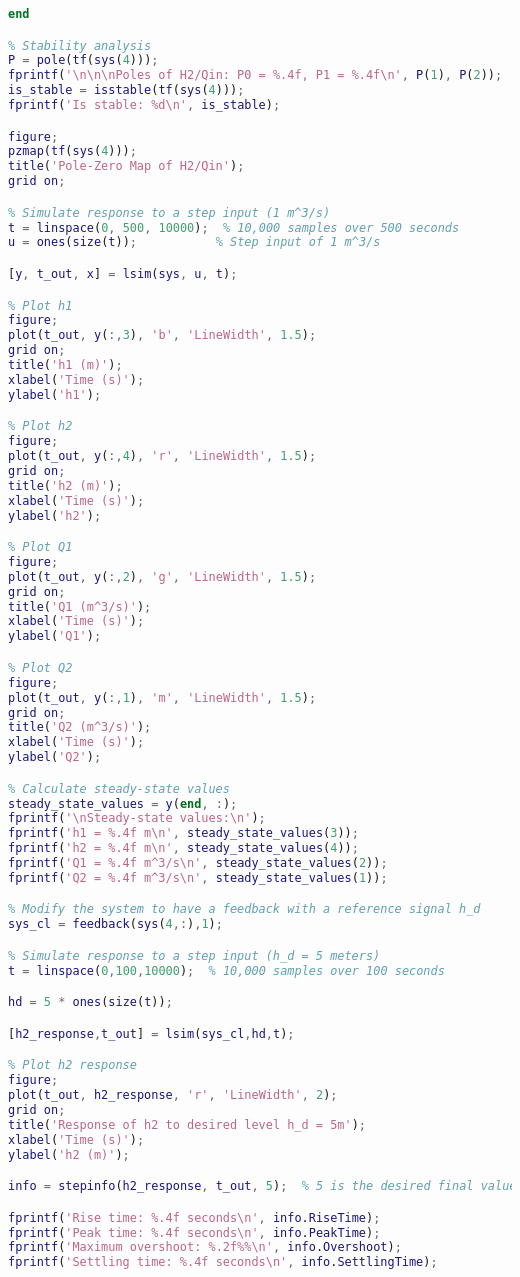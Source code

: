 \documentclass{report}
\begin{document}
\begin{flushleft}
\begin{lstlisting}[language=Matlab, caption=project code,label=lst:code]
end

% Stability analysis
P = pole(tf(sys(4)));
fprintf('\n\n\nPoles of H2/Qin: P0 = %.4f, P1 = %.4f\n', P(1), P(2));
is_stable = isstable(tf(sys(4)));
fprintf('Is stable: %d\n', is_stable);

figure;
pzmap(tf(sys(4)));
title('Pole-Zero Map of H2/Qin');
grid on;

% Simulate response to a step input (1 m^3/s)
t = linspace(0, 500, 10000);  % 10,000 samples over 500 seconds
u = ones(size(t));           % Step input of 1 m^3/s

[y, t_out, x] = lsim(sys, u, t);

% Plot h1
figure;
plot(t_out, y(:,3), 'b', 'LineWidth', 1.5);
grid on;
title('h1 (m)');
xlabel('Time (s)');
ylabel('h1');

% Plot h2
figure;
plot(t_out, y(:,4), 'r', 'LineWidth', 1.5);
grid on;
title('h2 (m)');
xlabel('Time (s)');
ylabel('h2');

% Plot Q1
figure;
plot(t_out, y(:,2), 'g', 'LineWidth', 1.5);
grid on;
title('Q1 (m^3/s)');
xlabel('Time (s)');
ylabel('Q1');

% Plot Q2
figure;
plot(t_out, y(:,1), 'm', 'LineWidth', 1.5);
grid on;
title('Q2 (m^3/s)');
xlabel('Time (s)');
ylabel('Q2');

% Calculate steady-state values
steady_state_values = y(end, :);
fprintf('\nSteady-state values:\n');
fprintf('h1 = %.4f m\n', steady_state_values(3));
fprintf('h2 = %.4f m\n', steady_state_values(4));
fprintf('Q1 = %.4f m^3/s\n', steady_state_values(2));
fprintf('Q2 = %.4f m^3/s\n', steady_state_values(1));

% Modify the system to have a feedback with a reference signal h_d
sys_cl = feedback(sys(4,:),1);

% Simulate response to a step input (h_d = 5 meters)
t = linspace(0,100,10000);  % 10,000 samples over 100 seconds

hd = 5 * ones(size(t));

[h2_response,t_out] = lsim(sys_cl,hd,t);

% Plot h2 response
figure;
plot(t_out, h2_response, 'r', 'LineWidth', 2);
grid on;
title('Response of h2 to desired level h_d = 5m');
xlabel('Time (s)');
ylabel('h2 (m)');

info = stepinfo(h2_response, t_out, 5);  % 5 is the desired final value

fprintf('Rise time: %.4f seconds\n', info.RiseTime);
fprintf('Peak time: %.4f seconds\n', info.PeakTime);
fprintf('Maximum overshoot: %.2f%%\n', info.Overshoot);
fprintf('Settling time: %.4f seconds\n', info.SettlingTime);


\end{lstlisting}
\end{flushleft}
\end{document}
